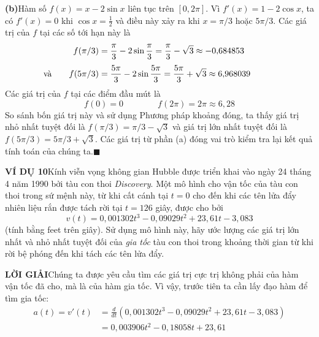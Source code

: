 \begin{minipage}[t]{0.72\textwidth}
    \vspace{4pt}
    \noindent
    \textbf{\textsf{\color{stewartcyan}(b)}}\enspace Hàm số $f(x) = x - 2 \sin x$ liên tục trên $[0, 2\pi]$. Vì $f'(x) = 1 - 2 \cos x$, ta có $f'(x) = 0$ khi $\cos x = \frac{1}{2}$ và điều này xảy ra khi $x = \pi/3$ hoặc $5\pi/3$. Các giá trị của $f$ tại các số tới hạn này là
    \begin{align*}
        f(\pi/3) &= \frac{\pi}{3} - 2 \sin \frac{\pi}{3} = \frac{\pi}{3} - \sqrt{3} \approx -0{,}684853 \\[3pt]
        \llap{\text{và}\qquad} f(5\pi/3) &= \frac{5\pi}{3} - 2 \sin \frac{5\pi}{3} = \frac{5\pi}{3} + \sqrt{3} \approx 6{,}968039
    \end{align*}
    Các giá trị của $f$ tại các điểm đầu mút là
    \[
        f(0) = 0 \qquad\qquad f(2\pi) = 2\pi \approx 6{,}28
    \]
    So sánh bốn giá trị này và sử dụng Phương pháp khoảng đóng, ta thấy giá trị nhỏ nhất tuyệt đối là $f(\pi/3) = \pi/3 - \sqrt{3}$ và giá trị lớn nhất tuyệt đối là $f(5\pi/3) = 5\pi/3 + \sqrt{3}$. Các giá trị từ phần (a) đóng vai trò kiểm tra lại kết quả tính toán của chúng ta.\hfill{\color{stewartcyan}$\blacksquare$}

    \vspace{8pt}
    \noindent
    \textbf{\textsf{\color{stewartcyan}VÍ DỤ 10}}\enspace Kính viễn vọng không gian Hubble được triển khai vào ngày 24 tháng 4 năm 1990 bởi tàu con thoi \emph{Discovery}. Một mô hình cho vận tốc của tàu con thoi trong sứ mệnh này, từ khi cất cánh tại $t = 0$ cho đến khi các tên lửa đẩy nhiên liệu rắn được tách rời tại $t = 126$ giây, được cho bởi
    \[
        v(t) = 0{,}001302t^3 - 0{,}09029t^2 + 23{,}61t - 3{,}083
    \]
    (tính bằng feet trên giây). Sử dụng mô hình này, hãy ước lượng các giá trị lớn nhất và nhỏ nhất tuyệt đối của \emph{gia tốc} tàu con thoi trong khoảng thời gian từ khi rời bệ phóng đến khi tách các tên lửa đẩy.\par

    \vspace{6pt}
    \noindent
    \textbf{\textsf{\color{stewartcyan}LỜI GIẢI}}\enspace Chúng ta được yêu cầu tìm các giá trị cực trị không phải của hàm vận tốc đã cho, mà là của hàm gia tốc. Vì vậy, trước tiên ta cần lấy đạo hàm để tìm gia tốc:
    \begin{align*}
        a(t) = v'(t) &= \frac{d}{dt}\left(0{,}001302t^3 - 0{,}09029t^2 + 23{,}61t - 3{,}083\right) \\[3pt]
        &= 0{,}003906t^2 - 0{,}18058t + 23{,}61
    \end{align*}
\end{minipage}
